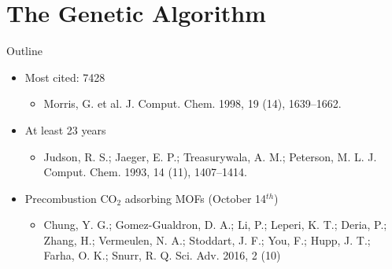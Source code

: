 \documentclass[10pt]{beamer}
\begin{document}
\section{The Genetic Algorithm}

{%
\begin{frame}{Outline}
	\begin{itemize}
		\item {Most cited: 7428 
    		\begin{itemize}
        		\item[]{Morris, G. et al. J. Comput. Chem. 1998, 19 (14), 1639$–$1662.}
        	\end{itemize}
		}
		\item{At least 23 years
    		\begin{itemize}
        		\item[]{Judson, R. S.; Jaeger, E. P.; Treasurywala, A. M.; Peterson, M. L. J. Comput. Chem. 1993, 14 (11), 1407–1414.}
        	\end{itemize}
        }
   		\item{Precombustion CO${}_2$ adsorbing MOFs (October 14${}^{th}$)
       		\begin{itemize}
           		\item[]{Chung, Y. G.; Gomez-Gualdron, D. A.; Li, P.; Leperi, K. T.; Deria, P.; Zhang, H.; Vermeulen, N. A.; Stoddart, J. F.; You, F.; Hupp, J. T.; Farha, O. K.; Snurr, R. Q. Sci. Adv. 2016, 2 (10)}
           	\end{itemize}
        }
	\end{itemize}
\end{frame}
}
\end{document}
